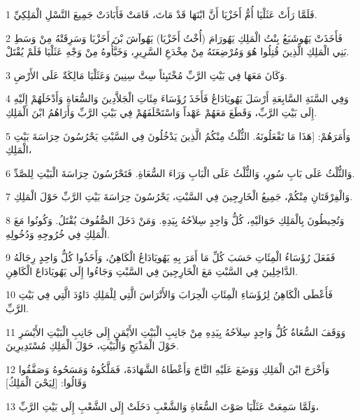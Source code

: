 \par 1 فَلَمَّا رَأَتْ عَثَلْيَا أُمُّ أَخَزْيَا أَنَّ ابْنَهَا قَدْ مَاتَ، قَامَتْ فَأَبَادَتْ جَمِيعَ النَّسْلِ الْمَلِكِيِّ.
\par 2 فَأَخَذَتْ يَهُوشَبَعُ بِنْتُ الْمَلِكِ يَهُورَامَ (أُخْتُ أَخَزْيَا) يَهُوآشَ بْنَ أَخَزْيَا وَسَرِقَتْهُ مِنْ وَسَطِ بَنِي الْمَلِكِ الَّذِينَ قُتِلُوا هُوَ وَمُرْضِعَتَهُ مِنْ مِخْدَعِ السَّرِيرِ، وَخَبَّأُوهُ مِنْ وَجْهِ عَثَلْيَا فَلَمْ يُقْتَلْ.
\par 3 وَكَانَ مَعَهَا فِي بَيْتِ الرَّبِّ مُخْتَبِئاً سِتَّ سِنِينَ وَعَثَلْيَا مَالِكَةٌ عَلَى الأَرْضِ.
\par 4 وَفِي السَّنَةِ السَّابِعَةِ أَرْسَلَ يَهُويَادَاعُ فَأَخَذَ رُؤَسَاءَ مِئَاتِ الْجَلاَّدِينَ وَالسُّعَاةِ وَأَدْخَلَهُمْ إِلَيْهِ إِلَى بَيْتِ الرَّبِّ، وَقَطَعَ مَعَهُمْ عَهْداً وَاسْتَحْلَفَهُمْ فِي بَيْتِ الرَّبِّ وَأَرَاهُمُ ابْنَ الْمَلِكِ.
\par 5 وَأَمَرَهُمْ: [هَذَا مَا تَفْعَلُونَهُ. الثُّلْثُ مِنْكُمُ الَّذِينَ يَدْخُلُونَ فِي السَّبْتِ يَحْرُسُونَ حِرَاسَةَ بَيْتِ الْمَلِكِ،
\par 6 وَالثُّلْثُ عَلَى بَابِ سُورٍ، وَالثُّلْثُ عَلَى الْبَابِ وَرَاءَ السُّعَاةِ. فَتَحْرُسُونَ حِرَاسَةَ الْبَيْتِ لِلصَّدِّ.
\par 7 وَالْفِرْقَتَانِ مِنْكُمْ، جَمِيعُ الْخَارِجِينَ فِي السَّبْتِ، يَحْرُسُونَ حِرَاسَةَ بَيْتِ الرَّبِّ حَوْلَ الْمَلِكِ.
\par 8 وَتُحِيطُونَ بِالْمَلِكِ حَوَالَيْهِ، كُلُّ وَاحِدٍ سِلاَحُهُ بِيَدِهِ. وَمَنْ دَخَلَ الصُّفُوفَ يُقْتَلُ. وَكُونُوا مَعَ الْمَلِكِ فِي خُرُوجِهِ وَدُخُولِهِ.
\par 9 فَفَعَلَ رُؤَسَاءُ الْمِئَاتِ حَسَبَ كُلِّ مَا أَمَرَ بِهِ يَهُويَادَاعُ الْكَاهِنُ، وَأَخَذُوا كُلُّ وَاحِدٍ رِجَالَهُ الدَّاخِلِينَ فِي السَّبْتِ مَعَ الْخَارِجِينَ فِي السَّبْتِ وَجَاءُوا إِلَى يَهُويَادَاعَ الْكَاهِنِ.
\par 10 فَأَعْطَى الْكَاهِنُ لِرُؤَسَاءِ الْمِئَاتِ الْحِرَابَ وَالأَتْرَاسَ الَّتِي لِلْمَلِكِ دَاوُدَ الَّتِي فِي بَيْتِ الرَّبِّ.
\par 11 وَوَقَفَ السُّعَاةُ كُلُّ وَاحِدٍ سِلاَحُهُ بِيَدِهِ مِنْ جَانِبِ الْبَيْتِ الأَيْمَنِ إِلَى جَانِبِ الْبَيْتِ الأَيْسَرِ حَوْلَ الْمَذْبَحِ وَالْبَيْتِ، حَوْلَ الْمَلِكِ مُسْتَدِيرِينَ.
\par 12 وَأَخْرَجَ ابْنَ الْمَلِكِ وَوَضَعَ عَلَيْهِ التَّاجَ وَأَعْطَاهُ الشَّهَادَةَ، فَمَلَّكُوهُ وَمَسَحُوهُ وَصَفَّقُوا وَقَالُوا: [لِيَحْيَ الْمَلِكُ]
\par 13 وَلَمَّا سَمِعَتْ عَثَلْيَا صَوْتَ السُّعَاةِ وَالشَّعْبِ دَخَلَتْ إِلَى الشَّعْبِ إِلَى بَيْتِ الرَّبِّ،
